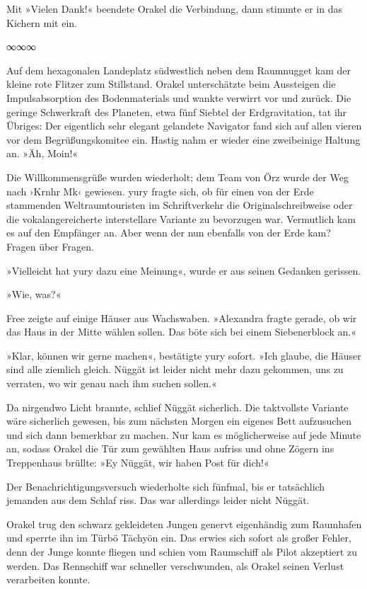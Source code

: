 Mit »Vielen Dank!« beendete Orakel die Verbindung, dann stimmte er in das Kichern mit ein.

\begin{center}
∞∞∞
\end{center}

Auf dem hexagonalen Landeplatz südwestlich neben dem Raumnugget kam der kleine rote Flitzer zum Stillstand. Orakel unterschätzte beim Aussteigen die Impulsabsorption des Bodenmaterials und wankte verwirrt vor und zurück. Die geringe Schwerkraft des Planeten, etwa fünf Siebtel der Erdgravitation, tat ihr Übriges: Der eigentlich sehr elegant gelandete Navigator fand sich auf allen vieren vor dem Begrüßungskomitee ein. Hastig nahm er wieder eine zweibeinige Haltung an. »Äh, Moin!«

Die Willkommensgrüße wurden wiederholt; dem Team von Örz wurde der Weg nach ›Krnhr Mk‹ gewiesen. yury fragte sich, ob für einen von der Erde stammenden Weltraumtouristen im Schriftverkehr die Originalschreibweise oder die vokalangereicherte interstellare Variante zu bevorzugen war. Vermutlich kam es auf den Empfänger an. Aber wenn der nun ebenfalls von der Erde kam? Fragen über Fragen.

»Vielleicht hat yury dazu eine Meinung«, wurde er aus seinen Gedanken gerissen.

»Wie, was?«

Free zeigte auf einige Häuser aus Wachswaben. »Alexandra fragte gerade, ob wir das Haus in der Mitte wählen sollen. Das böte sich bei einem Siebenerblock an.«

»Klar, können wir gerne machen«, bestätigte yury sofort. »Ich glaube, die Häuser sind alle ziemlich gleich. Nüggät ist leider nicht mehr dazu gekommen, uns zu verraten, wo wir genau nach ihm suchen sollen.«

Da nirgendwo Licht brannte, schlief Nüggät sicherlich. Die taktvollste Variante wäre sicherlich gewesen, bis zum nächsten Morgen ein eigenes Bett aufzusuchen und sich dann bemerkbar zu machen. Nur kam es möglicherweise auf jede Minute an, sodass Orakel die Tür zum gewählten Haus aufriss und ohne Zögern ins Treppenhaus brüllte: »Ey Nüggät, wir haben Post für dich!«

Der Benachrichtigungsversuch wiederholte sich fünfmal, bis er tatsächlich jemanden aus dem Schlaf riss. Das war allerdings leider nicht Nüggät.

Orakel trug den schwarz gekleideten Jungen genervt eigenhändig zum Raumhafen und sperrte ihn im Türbö Tächyön ein. Das erwies sich sofort als großer Fehler, denn der Junge konnte fliegen und schien vom Raumschiff als Pilot akzeptiert zu werden. Das Rennschiff war schneller verschwunden, als Orakel seinen Verlust verarbeiten konnte.

